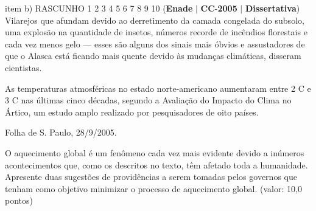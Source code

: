\documentclass{exam}
\begin{document}
\begin{questions}
item b) RASCUNHO
1
2
3
4
5
6
7
8
9
10
\question (\textbf{Enade} $|$ \textbf{CC}-\textbf{2005} $|$ \textbf{Dissertativa})
Vilarejos que afundam devido ao derretimento da camada congelada do subsolo, uma explosão na
quantidade de insetos, números recorde de incêndios florestais e cada vez menos gelo — esses são alguns dos
sinais mais óbvios e assustadores de que o Alasca está ficando mais quente devido às mudanças climáticas,
disseram cientistas.

As temperaturas atmosféricas no estado norte-americano aumentaram entre 2 C e 3 C nas últimas cinco
décadas, segundo a Avaliação do Impacto do Clima no Ártico, um estudo amplo realizado por pesquisadores
de oito países.

Folha de S. Paulo, 28/9/2005.

O aquecimento global é um fenômeno cada vez mais evidente devido a inúmeros acontecimentos que, como os descritos no texto, têm
afetado toda a humanidade. Apresente duas sugestões de providências a serem tomadas pelos governos que tenham como objetivo
minimizar o processo de aquecimento global. (valor: 10,0 pontos)


\end{questions}
\end{document}
